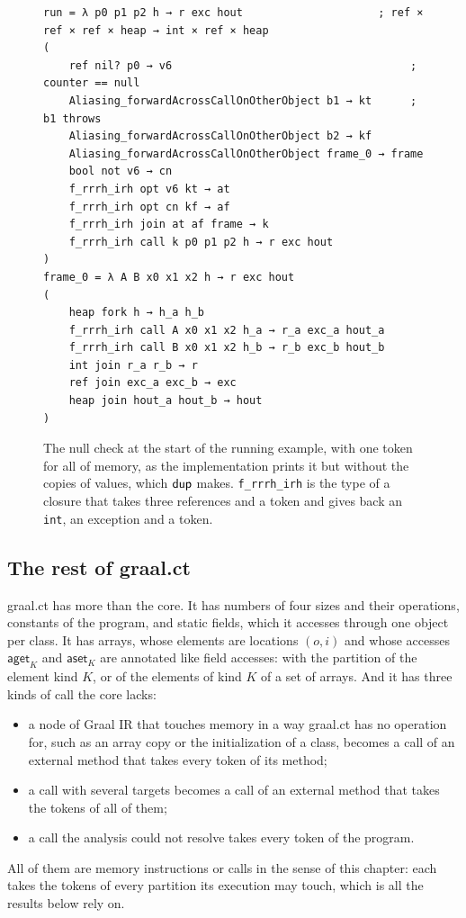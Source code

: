 \begin{figure}[t]
\begin{lstlisting}[language=ct]
run = λ p0 p1 p2 h → r exc hout                     ; ref × ref × ref × heap → int × ref × heap
(
    ref nil? p0 → v6                                     ; counter == null
    Aliasing_forwardAcrossCallOnOtherObject b1 → kt      ; b1 throws
    Aliasing_forwardAcrossCallOnOtherObject b2 → kf
    Aliasing_forwardAcrossCallOnOtherObject frame_0 → frame
    bool not v6 → cn
    f_rrrh_irh opt v6 kt → at
    f_rrrh_irh opt cn kf → af
    f_rrrh_irh join at af frame → k
    f_rrrh_irh call k p0 p1 p2 h → r exc hout
)
frame_0 = λ A B x0 x1 x2 h → r exc hout
(
    heap fork h → h_a h_b
    f_rrrh_irh call A x0 x1 x2 h_a → r_a exc_a hout_a
    f_rrrh_irh call B x0 x1 x2 h_b → r_b exc_b hout_b
    int join r_a r_b → r
    ref join exc_a exc_b → exc
    heap join hout_a hout_b → hout
)
\end{lstlisting}
\caption{The null check at the start of the running example, with one token
for all of memory, as the implementation prints it but without the copies of
values, which $\mathsf{dup}$ makes. \texttt{f\_rrrh\_irh} is the type of a closure that
takes three references and a token and gives back an \texttt{int}, an exception
and a token.}
\label{fig:ee-branch}
\end{figure}

\subsection{The rest of graal.ct}

graal.ct has more than the core. It has numbers of four sizes and their
operations, constants of the program, and static fields, which it accesses
through one object per class. It has arrays, whose elements are locations
$(o, i)$ and whose accesses $\mathsf{aget}_K$ and $\mathsf{aset}_K$ are annotated
like field accesses: with the partition of the element kind $K$, or of the
elements of kind $K$ of a set of arrays. And it has three kinds of call the core
lacks:
\begin{itemize}
\item a node of Graal IR that touches memory in a way graal.ct has no operation
  for, such as an array copy or the initialization of a class, becomes a call
  of an external method that takes every token of its method;
\item a call with several targets becomes a call of an external method that
  takes the tokens of all of them;
\item a call the analysis could not resolve takes every token of the program.
\end{itemize}
All of them are memory instructions or calls in the sense of this chapter: each
takes the tokens of every partition its execution may touch, which is all the
results below rely on.

